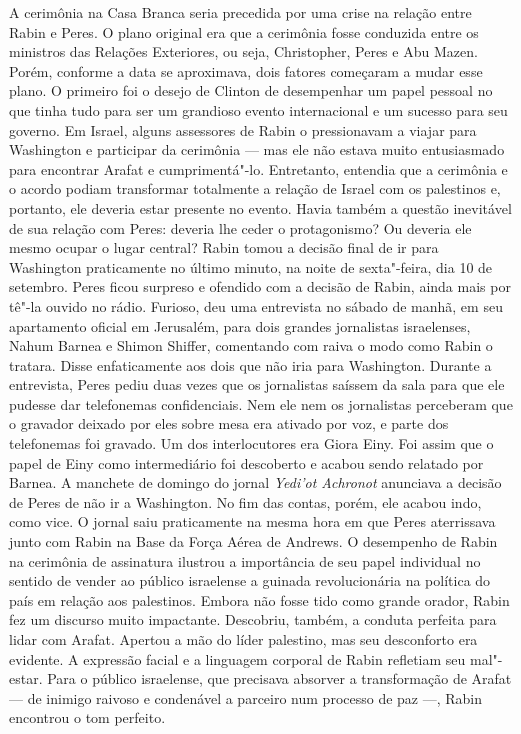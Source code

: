 A cerimônia na Casa Branca seria precedida por uma crise na relação
entre Rabin e Peres. O plano original era que a cerimônia fosse
conduzida entre os ministros das Relações Exteriores, ou seja,
Christopher, Peres e Abu Mazen. Porém, conforme a data se aproximava,
dois fatores começaram a mudar esse plano. O primeiro foi o desejo de
Clinton de desempenhar um papel pessoal no que tinha tudo para ser um
grandioso evento internacional e um sucesso para seu governo. Em Israel,
alguns assessores de Rabin o pressionavam a viajar para Washington e
participar da cerimônia --- mas ele não estava muito entusiasmado para
encontrar Arafat e cumprimentá"-lo. Entretanto, entendia que a cerimônia e o
acordo podiam transformar totalmente a relação de Israel com os
palestinos e, portanto, ele deveria estar presente no evento. Havia também a questão
inevitável de sua relação com Peres: deveria lhe ceder o protagonismo?
Ou deveria ele mesmo ocupar o lugar central? Rabin tomou a decisão final de
ir para Washington praticamente no último minuto, na
noite de sexta"-feira, dia 10 de setembro. Peres ficou surpreso e
ofendido com a decisão de Rabin, ainda mais por tê"-la ouvido no rádio.
Furioso, deu uma entrevista no sábado de manhã, em seu apartamento
oficial em Jerusalém, para dois grandes jornalistas israelenses, Nahum
Barnea e Shimon Shiffer, comentando com raiva o modo como Rabin o
tratara. Disse enfaticamente aos dois que não iria para Washington.
Durante a entrevista, Peres pediu duas vezes que os jornalistas saíssem
da sala para que ele pudesse dar telefonemas confidenciais. Nem ele nem
os jornalistas perceberam que o gravador deixado por eles sobre mesa era
ativado por voz, e parte dos telefonemas foi gravado. Um dos
interlocutores era Giora Einy. Foi assim que o papel de Einy como
intermediário foi descoberto e acabou sendo relatado por Barnea. A
manchete de domingo do jornal \textit{Yedi'ot Achronot} anunciava a
decisão de Peres de não ir a Washington. No fim das contas, porém, ele
acabou indo, como vice. O jornal saiu praticamente na mesma hora em que
Peres aterrissava junto com Rabin na Base da Força Aérea de Andrews. O
desempenho de Rabin na cerimônia de assinatura ilustrou a importância de
seu papel individual no sentido de vender ao público israelense a
guinada revolucionária na política do país em relação aos palestinos.
Embora não fosse tido como grande orador, Rabin fez um discurso muito
impactante. Descobriu, também, a conduta perfeita para lidar com Arafat.
Apertou a mão do líder palestino, mas seu desconforto era evidente. A
expressão facial e a linguagem corporal de Rabin refletiam seu
mal"-estar. Para o público israelense, que precisava absorver a
transformação de Arafat --- de inimigo raivoso e condenável a parceiro
num processo de paz ---, Rabin encontrou o tom perfeito.

